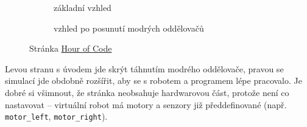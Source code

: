 \documentclass[main.tex]{subfiles}
\begin{document}
	\begin{figure}[h!]%
		\begin{subfigure}{.48\textwidth}%
			\centering%
			\caption{základní vzhled}%
		\end{subfigure} \hspace{.03\textwidth}%
		\begin{subfigure}{.48\textwidth}%
			\centering%
			\caption{vzhled po posunutí modrých oddělovačů}%
		\end{subfigure}%
		\caption{Stránka \href{http://www.robotmesh.com/create/176384}{Hour of Code}}
	\end{figure}

	Levou stranu s úvodem jde skrýt táhnutím modrého oddělovače, pravou se simulací jde obdobně rozšířit, aby se s robotem a programem lépe pracovalo. Je dobré si všimnout, že stránka neobsahuje hardwarovou část, protože není co nastavovat -- virtuální robot má motory a senzory již předdefinované (např. \texttt{motor\_left}, \texttt{motor\_right}).
\end{document}
